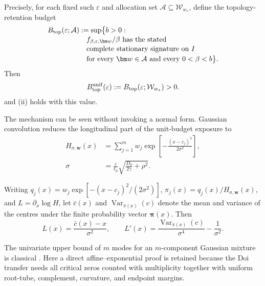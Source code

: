 Precisely, for each fixed such $\varepsilon$ and allocation set
$\mathcal A\subseteq\mathcal W_{w_*}$, define the topology-retention budget
\begin{align}
 B_{\rm top}(\varepsilon;\mathcal A)
 &:=\sup\bigl\{b>0:\nonumber\\[-2pt]
 &\quad f_{\beta,\varepsilon,\bm w}/\beta
 \text{ has the stated}\nonumber\\[-2pt]
 &\quad\text{complete stationary signature on }I
 \nonumber\\[-2pt]
 &\quad\text{for every }\bm w\in\mathcal A
 \text{ and every }0<\beta<b\bigr\}.
 \label{eq:exact-m-btop}
\end{align}
Then
\begin{equation}
 B_{\rm top}^{\rm unif}(\varepsilon)
 :=B_{\rm top}(\varepsilon;\mathcal W_{w_*})>0.
 \label{eq:exact-m-btop-unif}
\end{equation}
and (ii) holds with this value.

The mechanism can be seen without invoking a normal form.  Gaussian
convolution reduces the longitudinal part of the unit-budget exposure to
\begin{equation}
 \begin{aligned}
  H_{\sigma,\bm w}(x)
  &=\sum_{j=1}^{m}w_j
    \exp\!\left[-\frac{(x-c_j)^2}{2\sigma^2}\right],\\
  \sigma&=\frac{\varepsilon}{\ell_0}
  \sqrt{\frac{D_0}{2\gamma}+\rho^2}.
 \end{aligned}
 \label{eq:exact-m-mixture}
\end{equation}

Writing $q_j(x)=w_j\exp[-(x-c_j)^2/(2\sigma^2)]$,
$\pi_j(x)=q_j(x)/H_{\sigma,\bm w}(x)$, and
$L=\partial_x\log H$, let $\bar c(x)$ and
$\operatorname{Var}_{\pi(x)}(c)$ denote the mean and variance of the centres
under the finite probability vector $\bm\pi(x)$.  Then
\begin{equation}
 L(x)=\frac{\bar c(x)-x}{\sigma^2},
 \qquad
 L'(x)=\frac{\operatorname{Var}_{\pi(x)}(c)}{\sigma^4}
       -\frac{1}{\sigma^2}.
 \label{eq:exact-m-log-slope}
\end{equation}

The univariate upper bound of $m$ modes for an $m$-component Gaussian mixture
is classical \cite{carreiraPerpinanWilliams2003modes,
amendolaEngstromHaase2020modes}.  Here a direct affine--exponential proof is
retained because the Doi transfer needs all critical zeros counted with
multiplicity together with uniform root-tube, complement, curvature, and
endpoint margins.

